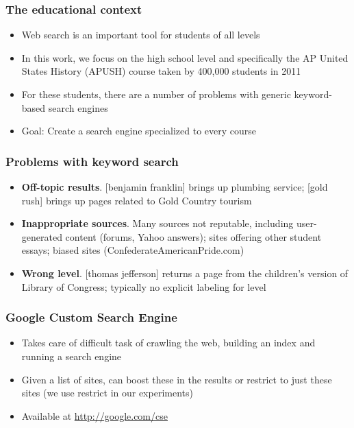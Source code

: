 \documentclass{beamer}
\author{Neel Guha, Matt Wytock \\ Gunn High School, Carnegie Mellon University}
\begin{document}
\maketitle

\begin{frame}
\frametitle{The educational context}
\begin{itemize}
\item Web search is an important tool for students of all levels
\item In this work, we focus on the high school level and specifically the AP
  United States History (APUSH) course taken by 400,000 students in 2011
\item For these students, there are a number of problems with generic
  keyword-based search engines
\item Goal: Create a search engine specialized to every course
\end{itemize}
\end{frame}

\begin{frame}
\frametitle{Problems with keyword search}
\begin{itemize}
\item {\bf Off-topic results}. [benjamin franklin] brings up plumbing service;
  [gold rush] brings up pages related to Gold Country tourism
\item {\bf Inappropriate sources}. Many sources not reputable, including
  user-generated content (forums, Yahoo answers); sites offering other student
  essays; biased sites (ConfederateAmericanPride.com)
\item {\bf Wrong level}. [thomas jefferson] returns a page from the children's
  version of Library of Congress; typically no explicit labeling for level
\end{itemize}
\end{frame}

\begin{frame}
\frametitle{Google Custom Search Engine}
\begin{itemize}
\item Takes care of difficult task of crawling the web, building an index
  and running a search engine
\item Given a list of sites, can boost these in the results or restrict to just
  these sites (we use restrict in our experiments)
\item Available at \url{http://google.com/cse}
\end{itemize}
\end{frame}
\end{document}
